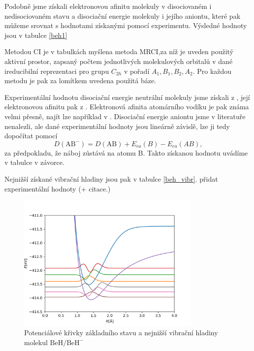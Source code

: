 Podobně jsme  získali elektronovou afinitu molekuly v disociovaném i nedisociovaném 
stavu a disociační energie molekuly i jejího aniontu, které pak můžeme srovnat s 
hodnotami získanými pomocí experimentu. Výsledné hodnoty jsou v tabulce \ref{beh1}

Metodou CI je v tabulkách myšlena metoda MRCI,za níž je uveden použitý aktivní prostor, 
zapsaný počtem jednotlivých molekulových orbitalů v dané ireducibilní reprezentaci pro grupu 
 $C_{2h}$ v pořadí $A_1, B_1, B_2, A_2$. Pro každou metodu je pak za lomítkem uvedena použitá báze.

Experimentální hodnotu disociační energie neutrální molekuly jsme získali 
z \cite{BeH-LeRoy}, její elektronovou afinitu pak z \cite{BeH-ElAf}. Elektronová 
afinita atomárního vodíku je pak známa velmi přesně, 
najít lze například v \cite{H-ElAf}. Disociační energie aniontu jsme 
v literatuře nenalezli, ale dané experimentální hodnoty jsou lineárně závislě, 
lze ji tedy dopočítat pomocí
\begin{equation}
D(\mathrm{AB^-}) = D(\mathrm{AB}) + E_{ea}(B) - E_{ea}(AB),
\end{equation}
za předpokladu, že náboj zůstává na atomu B. Takto získanou hodnotu uvádíme v tabulce v závorce.

Nejnižší získané vibrační hladiny jsou pak v tabulce \ref{beh_vibr}.
\TD přidat experimentální hodnoty (+ citace.)

\begin{figure}
\centering
\includegraphics[width=0.8\textwidth]{../img/BeH-vibr1.png}
\caption{Potenciálové křivky základního stavu a nejnižší vibrační hladiny molekul $\mathrm{BeH/BeH^-}$}
\label{VibrBeH1}
\end{figure}
